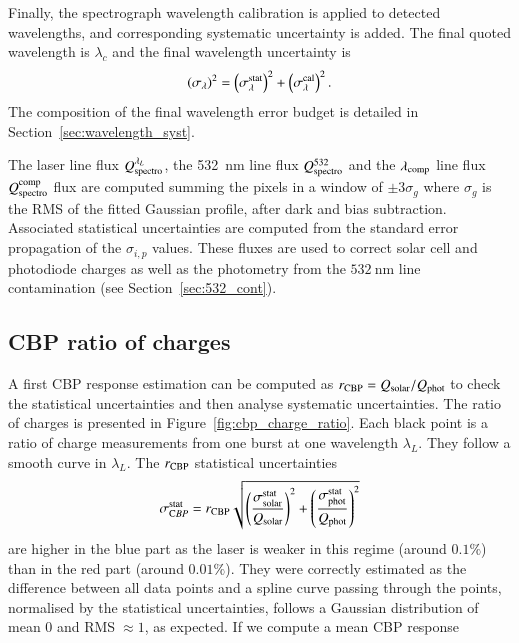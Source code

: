 Finally, the spectrograph wavelength calibration is applied to detected wavelengths, and corresponding systematic uncertainty is added. The final quoted wavelength is $\lambda_c$ and the final wavelength uncertainty is
\begin{equation}
  \left(\sigma_{\lambda}\right)^2 =  \left(\sigma_{\lambda}^{\rm stat}\right)^2 +  \left(\sigma_{\lambda}^{\rm cal}\right)^2.   
\end{equation}
The composition of the final wavelength error budget is detailed in Section~\ref{sec:wavelength_syst}.

The laser line flux $Q_{\mathrm{spectro}}^{\lambda_L}$, the \SI{532}{\nm} line flux $Q_{\mathrm{spectro}}^{532}$ and the $\lambda_{\rm comp}$ line flux $Q_{\mathrm{spectro}}^{\rm comp}$ flux are computed summing the pixels in a window of $\pm 3 \sigma_g$ where $\sigma_g$ is the RMS of the fitted Gaussian profile, after dark and bias subtraction. Associated statistical uncertainties are computed from the standard error propagation of the $\sigma_{i,p}$ values. These fluxes are used to correct solar cell and photodiode charges as well as the \SD photometry from the $\SI{532}{\nm}$ line contamination (see Section~\ref{sec:532_cont}).  %

\subsection{CBP ratio of charges}

A first CBP response estimation can be computed as $r_{\rm CBP} = Q_{\mathrm{solar}}/Q_{\mathrm{phot}}$ to check the statistical uncertainties and then analyse systematic uncertainties. The ratio of charges is presented in Figure~\ref{fig:cbp_charge_ratio}. Each black point is a ratio of charge measurements from one burst at one wavelength $\lambda_L$. They follow a smooth curve in $\lambda_L$. The $r_{\rm CBP}$ statistical uncertainties 
\begin{equation}
    \sigma_{\mathrm CBP}^{\rm stat} = r_{\rm CBP} \sqrt{\left(\frac{\sigma_{\mathrm{solar}}^{\mathrm{stat}}}{Q_{\mathrm{solar}}}\right)^2 +  \left(\frac{\sigma_{\mathrm{phot}}^{\mathrm{stat}}}{Q_{\mathrm{phot}}}\right)^2 }
\end{equation}
are higher in the blue part as the laser is weaker in this regime (around $0.1\%$) than in the red part (around $0.01\%$). They were correctly estimated as the difference between all data points and a spline curve passing through the points, normalised by the statistical uncertainties, follows a Gaussian distribution of mean 0 and RMS$\;\approx 1$, as expected. If we compute a mean CBP response

